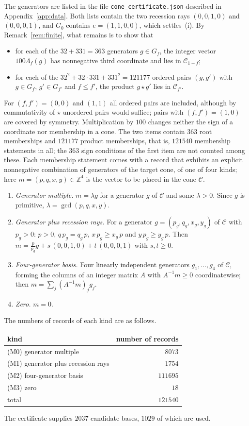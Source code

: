 \documentclass{amsart}
\numberwithin{equation}{section}
\theoremstyle{plain}
\theoremstyle{definition}
\theoremstyle{remark}
\newcommand{\C}{\mathcal{C}}
\begin{document}
The generators are listed in the file \texttt{cone\_certificate.json} described in Appendix~\ref{app:data}. Both lists contain the two recession rays $(0,0,1,0)$ and $(0,0,0,1)$, and $G_0$ contains $e=(1,1,0,0)$, which settles~(i). By Remark~\ref{rem:finite}, what remains is to show that
\begin{itemize}[leftmargin=*]
\item for each of the $32+331=363$ generators $g\in G_f$, the integer vector $100\Lambda_f(g)$ has nonnegative third coordinate and lies in $\C_{1-f}$;
\item for each of the $32^2+32\cdot331+331^2=121177$ ordered pairs $(g,g')$ with $g\in G_f$, $g'\in G_{f'}$ and $f\le f'$, the product $g\star g'$ lies in $\C_{f'}$.
\end{itemize}
For $(f,f')=(0,0)$ and $(1,1)$ all ordered pairs are included, although by commutativity of $\star$ unordered pairs would suffice; pairs with $(f,f')=(1,0)$ are covered by symmetry. Multiplication by $100$ changes neither the sign of a coordinate nor membership in a cone. The two items contain $363$ root memberships and $121177$ product memberships, that is, $121540$ membership statements in all; the $363$ sign conditions of the first item are not counted among these. Each membership statement comes with a record that exhibits an explicit nonnegative combination of generators of the target cone, of one of four kinds; here $m=(p,q,x,y)\in\mathbb Z^4$ is the vector to be placed in the cone $\C$.
\begin{enumerate}[label=\textup{(M\arabic*)},start=0,leftmargin=*]
\item \emph{Generator multiple.} $m=\lambda g$ for a generator $g$ of $\C$ and some $\lambda>0$. Since $g$ is primitive, $\lambda=\gcd(p,q,x,y)$.
\item \emph{Generator plus recession rays.} For a generator $g=(p_g,q_g,x_g,y_g)$ of $\C$ with $p_g>0$: $p>0$, $q\,p_g=q_g\,p$, $x\,p_g\ge x_g\,p$ and $y\,p_g\ge y_g\,p$. Then $m=\frac{p}{p_g}g+s\,(0,0,1,0)+t\,(0,0,0,1)$ with $s,t\ge0$.
\item \emph{Four-generator basis.} Four linearly independent generators $g_1,\dots,g_4$ of $\C$, forming the columns of an integer matrix $A$ with $A^{-1}m\ge0$ coordinatewise; then $m=\sum_j(A^{-1}m)_jg_j$.
\item \emph{Zero.} $m=0$.
\end{enumerate}
The numbers of records of each kind are as follows.
\begin{center}
\begin{tabular}{lr}
\hline
kind & number of records\\\hline
(M0) generator multiple & $8073$\\
(M1) generator plus recession rays & $1754$\\
(M2) four-generator basis & $111695$\\
(M3) zero & $18$\\\hline
total & $121540$\\\hline
\end{tabular}
\end{center}
The certificate supplies $2037$ candidate bases, $1029$ of which are used.
\end{document}
